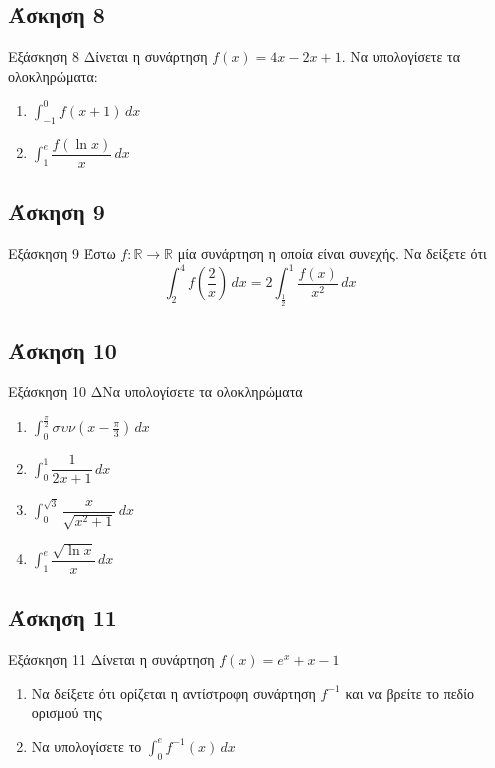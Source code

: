 \documentclass[greek]{beamer}
\begin{document}
\subsection{Άσκηση 8}
\begin{frame}[label=Άσκηση8,t]{Εξάσκηση 8}
  Δίνεται η συνάρτηση $f(x)=4x-2x+1$. Να υπολογίσετε τα ολοκληρώματα:
  \begin{enumerate}
    \item<1-> $\int_{-1}^{0} f(x+1) \,dx$
    \item<2-> $\int_{1}^{e} \dfrac{f(\ln x)}{x} \,dx$
  \end{enumerate}

\end{frame}

\subsection{Άσκηση 9}
\begin{frame}[label=Άσκηση9,t]{Εξάσκηση 9}
  Έστω $f:\mathbb{R}\to\mathbb{R}$ μία συνάρτηση η οποία είναι συνεχής. Να δείξετε ότι
  $$\int_{2}^{4} f\left( \dfrac{2}{x} \right)  \,dx=2\int_{\frac{1}{2}}^{1} \dfrac{f(x)}{x^2} \,dx$$

\end{frame}

\subsection{Άσκηση 10}
\begin{frame}[label=Άσκηση10,t]{Εξάσκηση 10}
  ΔΝα υπολογίσετε τα ολοκληρώματα
  \begin{enumerate}
    \item<1-> $\int_{0}^{\frac{π}{2}} συν(x-\frac{π}{3}) \,dx$
    \item<2-> $\int_{0}^{1} \dfrac{1}{2x+1} \,dx$
    \item<3-> $\int_{0}^{\sqrt{3}} \dfrac{x}{\sqrt{x^2+1}} \,dx$
    \item<4-> $\int_{1}^{e} \dfrac{\sqrt{\ln x}}{x} \,dx$
  \end{enumerate}

\end{frame}

\subsection{Άσκηση 11}
\begin{frame}[label=Άσκηση11,,t]{Εξάσκηση 11}
  Δίνεται η συνάρτηση $f(x)=e^x+x-1$
  \begin{enumerate}
    \item<1-> Να δείξετε ότι ορίζεται η αντίστροφη συνάρτηση $f^{-1}$ και να βρείτε το πεδίο ορισμού της
    \item<2-> Να υπολογίσετε το $\int_{0}^{e} f^{-1}(x) \,dx$
  \end{enumerate}

\end{frame}
\end{document}
